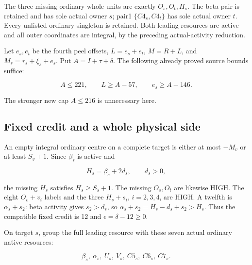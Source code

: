 \documentclass[10pt,a4paper]{article}
\theoremstyle{definition}
\begin{document}
The three missing ordinary whole units are exactly \(O_s,\allowbreak{}O_t,\allowbreak{}H_s\). The
beta pair is retained and has sole actual owner \(s\); pair1
\(\{C4_s,\allowbreak{}C4_t\}\) has sole actual owner \(t\). Every unlisted ordinary
singleton is retained. Both leading resources are active and all outer
coordinates are integral,\allowbreak{} by the preceding actual-activity reduction.

Let \(e_s,\allowbreak{}e_t\) be the fourth peel offsets,\allowbreak{} \(L=\allowbreak{}e_s+\allowbreak{}e_t\),\allowbreak{} \(M=\allowbreak{}R+\allowbreak{}L\),\allowbreak{}
and \(M_s=\allowbreak{}r_s+\allowbreak{}\xi_s+\allowbreak{}e_s\). Put \(A=\allowbreak{}I+\allowbreak{}\tau+\allowbreak{}\delta\). The following
already proved source bounds suffice:

\[
A\le221,\allowbreak{}\qquad L\ge A-57,\allowbreak{}\qquad e_s\ge A-146.
\]

The stronger new cap \(A\le216\) is unnecessary here.

\hypertarget{fixed-credit-and-a-whole-physical-side}{%
\subsection{Fixed credit and a whole physical
side}\label{fixed-credit-and-a-whole-physical-side}}

An empty integral ordinary centre on a complete target is either at most
\(-M_v\) or at least \(S_v+\allowbreak{}1\). Since \(\beta_s\) is active and

\[
H_s=\allowbreak{}\beta_s+\allowbreak{}2d_s,\allowbreak{}\qquad d_s>0,\allowbreak{}
\]

the missing \(H_s\) satisfies \(H_s\ge S_s+\allowbreak{}1\). The missing \(O_s,\allowbreak{}O_t\)
are likewise HIGH. The eight \(O_v+\allowbreak{}v_i\) labels and the three
\(H_s+\allowbreak{}s_i\),\allowbreak{} \(i=\allowbreak{}2,\allowbreak{}3,\allowbreak{}4\),\allowbreak{} are HIGH. A twelfth is \(\alpha_s+\allowbreak{}s_2\): beta
activity gives \(s_2>d_s\),\allowbreak{} so \(\alpha_s+\allowbreak{}s_2=\allowbreak{}H_s-d_s+\allowbreak{}s_2>H_s\). Thus
the compatible fixed credit is 12 and \(\epsilon=\allowbreak{}\delta-12\ge0\).

On target \(s\),\allowbreak{} group the full leading resource with these seven actual
ordinary native resources:

\[
\beta_s,\allowbreak{}\ \alpha_s,\allowbreak{}\ U_s,\allowbreak{}\ V_s,\allowbreak{}\ C5_s,\allowbreak{}\ C6_s,\allowbreak{}\ C7_s.
\]
\end{document}
